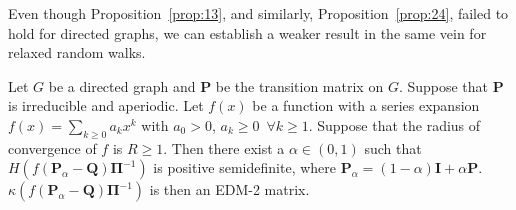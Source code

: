 % 
% 
Even though Proposition~\ref{prop:13}, and similarly,
Proposition~\ref{prop:24}, failed to hold for directed graphs, we
can establish a weaker result in the same vein for relaxed
random walks.
\begin{proposition}
  \label{prop:26}
  Let $G$ be a directed graph and $\mathbf{P}$ be the transition
  matrix on $G$. Suppose that $\mathbf{P}$ is irreducible and
  aperiodic. Let $f(x)$ be a function with a series expansion $f(x) =
  \sum_{k \geq 0}{a_k x^k}$ with $a_0 > 0$, $a_k \geq 0\,\,\, \forall
  k \geq 1$. Suppose that the radius of convergence of $f$ is $R \geq
  1$. Then there exist a $\alpha \in (0,1)$ such that
  $H(f(\mathbf{P}_\alpha - \mathbf{Q}) \bm{\Pi}^{-1})$ is positive
  semidefinite, where $\mathbf{P}_\alpha = (1 -
  \alpha)\mathbf{I} + \alpha \mathbf{P}$. $\kappa( f(\mathbf{P}_\alpha
  - \mathbf{Q})\bm{\Pi}^{-1})$ is then an EDM-2
  matrix.  
\end{proposition}
%
